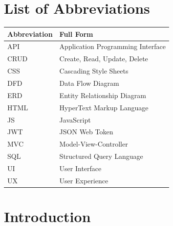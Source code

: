 \documentclass[12pt]{report}
\begin{document}
\cleardoublepage
{}
{}
\tableofcontents
\newpage


\renewcommand{\listfigurename}{\centering\bfseries\fontsize{16pt}{18pt}\selectfont List of Figures}
\renewcommand{\listtablename}{\centering\bfseries\fontsize{16pt}{18pt}\selectfont List of Tables}

\cleardoublepage
{}
{}
\listoffigures
\newpage

\cleardoublepage
{}
{}
\listoftables
\newpage


\cleardoublepage
{}
{}
\chapter*{List of Abbreviations}
\normalsize
\begin{tabular}{@{}p{3.5cm} p{9.5cm}@{}}
\toprule[1.5pt]  %
\textbf{Abbreviation} & \textbf{Full Form} \\
\midrule[1pt]    %
API  & Application Programming Interface \\
CRUD & Create, Read, Update, Delete \\
CSS  & Cascading Style Sheets \\
DFD  & Data Flow Diagram \\
ERD  & Entity Relationship Diagram \\
HTML & HyperText Markup Language \\
JS   & JavaScript \\
JWT  & JSON Web Token \\
MVC  & Model-View-Controller \\
SQL  & Structured Query Language \\
UI   & User Interface \\
UX   & User Experience \\
\bottomrule[1.5pt]  %
\end{tabular}
\newpage

\chapter{Introduction}
\justifying
\end{document}
